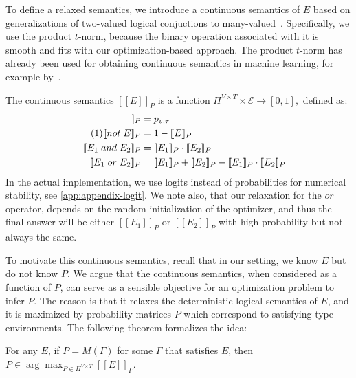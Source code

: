 \documentclass[sigplan,10pt,review,anonymous]{acmart} %
\newcommand{\qqpi}[2]{[\![#2]\!]_{#1}}
\newcommand\numberthis{\addtocounter{equation}{1}\tag{\theequation}}
\newcommand{\margincomment}[2]{\marginpar{\scriptsize\color{Maroon}#1 says: #2}}
\newcommand{\cas}[1]{\margincomment{Charles}{#1}}
\newcommand{\ivp}[1]{\margincomment{IVP}{#1}}
\theoremstyle{plain}
\theoremstyle{remark}
\theoremstyle{definition}
\begin{document}
To define a relaxed semantics, we introduce a continuous semantics of $E$ based on generalizations of two-valued logical conjuctions
to many-valued~\cite{hajek1998}.
Specifically, we use the product $t$-norm, because the binary operation associated with it is smooth and fits with our optimization-based approach.
The product $t$-norm has already been used for obtaining continuous semantics in machine learning, for example by~\citet{rocktaschel15}.

The continuous semantics $\qqpi{P}{E}$ is a function $\Pi^{V \times T} \times \mathcal{E} \rightarrow [0, 1],$
defined as:
\begin{align*}
	\qqpi{P}{x_v \mathrel{is} l_\tau} & = p_{v,\tau}                        \\  \numberthis \label{eq:logical}
	\qqpi{P}{\mathrel{not} E}         & = 1-\qqpi{P}{E}                     \\
	\qqpi{P}{E_1 \mathrel{and} E_2}   & = \qqpi{P}{E_1} \cdot \qqpi{P}{E_2} \\
	\qqpi{P}{E_1 \mathrel{or} E_2}    & =
	\qqpi{P}{E_1} + \qqpi{P}{E_2} - \qqpi{P}{E_1}\cdot\qqpi{P}{E_2}
\end{align*}
In the actual implementation, we use logits instead of probabilities
for numerical stability, see \cref{app:appendix-logit}. We note also, that our relaxation for the $\mathrel{or}$ operator, depends on the random initialization of the optimizer, and thus the final answer will be 
either $\qqpi{P}{E_1}$ or $\qqpi{P}{E_2}$ with high probability but 
not always the same.

To motivate this continuous semantics, recall that in our setting, we know $E$ but
do not know $P$. We argue that the continuous semantics,
when considered as a function of $P$, can serve as a sensible
objective for an optimization problem to infer $P.$
The reason is that it relaxes
the deterministic logical semantics of $E$, and it is maximized
by probability matrices $P$ which correspond to satisfying type environments.
The following theorem formalizes the idea:
\begin{theorem}
	For any $E$, if $P = M(\Gamma)$ for some $\Gamma$ that satisfies $E$, then $P \in \arg\max_{P \in \Pi^{V \times T}} \qqpi{P}{E}$.
\end{theorem}
\end{document}
